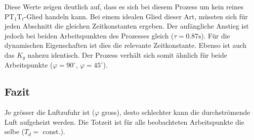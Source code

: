 Diese Werte zeigen deutlich auf, dass es sich bei diesem Prozess um kein
reines PT$_1$T$_t$-Glied handeln kann. Bei einem idealen Glied dieser Art,
müssten sich für jeden Abschnitt die gleichen Zeitkonstanten ergeben.
Der anfängliche Anstieg ist jedoch bei beiden Arbeitspunkten des Prozesses
gleich ($\tau = 0.87\si{\second}$). Für die dynamischen Eigenschaften ist
dies die relevante Zeitkonstante. Ebenso ist auch das $K_g$ nahezu identisch.
Der Prozess verhält sich somit ähnlich für beide Arbeitspunkte
($\varphi = 90^\circ$, $\varphi = 45^\circ$).

\subsection{Fazit}
Je grösser die Luftzufuhr ist ($\varphi$ gross), desto schlechter kann die
durchströmende Luft aufgeheizt werden. Die Totzeit ist für alle beobachteten
Arbeitspunkte die selbe ($T_d =$ const.).
